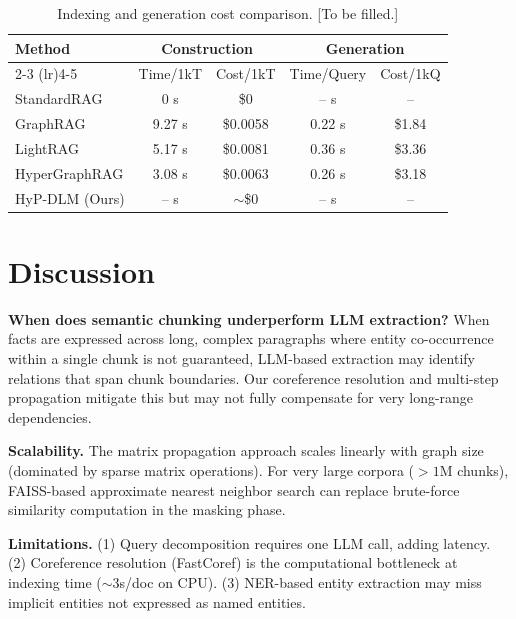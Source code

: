 \documentclass[11pt,a4paper]{article}
\begin{document}
\begin{table}[ht]
\centering
\caption{Indexing and generation cost comparison. [To be filled.]}
\label{tab:cost}
\begin{tabular}{l cc cc}
\toprule
\multirow{2}{*}{Method} & \multicolumn{2}{c}{Construction} & \multicolumn{2}{c}{Generation} \\
\cmidrule(lr){2-3} \cmidrule(lr){4-5}
 & Time/1kT & Cost/1kT & Time/Query & Cost/1kQ \\
\midrule
StandardRAG & 0 s & \$0 & -- s & -- \\
GraphRAG & 9.27 s & \$0.0058 & 0.22 s & \$1.84 \\
LightRAG & 5.17 s & \$0.0081 & 0.36 s & \$3.36 \\
HyperGraphRAG & 3.08 s & \$0.0063 & 0.26 s & \$3.18 \\
HyP-DLM (Ours) & -- s & $\sim$\$0 & -- s & -- \\
\bottomrule
\end{tabular}
\end{table}


\section{Discussion}

\textbf{When does semantic chunking underperform LLM extraction?} When facts are expressed across long, complex paragraphs where entity co-occurrence within a single chunk is not guaranteed, LLM-based extraction may identify relations that span chunk boundaries. Our coreference resolution and multi-step propagation mitigate this but may not fully compensate for very long-range dependencies.

\textbf{Scalability.} The matrix propagation approach scales linearly with graph size (dominated by sparse matrix operations). For very large corpora ($> 1$M chunks), FAISS-based approximate nearest neighbor search can replace brute-force similarity computation in the masking phase.

\textbf{Limitations.} (1) Query decomposition requires one LLM call, adding latency. (2) Coreference resolution (FastCoref) is the computational bottleneck at indexing time ($\sim$3s/doc on CPU). (3) NER-based entity extraction may miss implicit entities not expressed as named entities.


\end{document}
